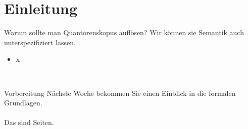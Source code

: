 \section{Einleitung}

\begin{frame}
  {Warum sollte man Quantorenskopus auflösen?}
  \onslide<+->
  \onslide<+->
  Wir können sie Semantik auch unterspezifiziert lassen.\\
  \Zeile
  \begin{itemize}[<+->]
    \item x
  \end{itemize}
  \Zeile
  \onslide<+->
  \centering 
  \\
\end{frame}

\begin{frame}
  {Vorbereitung}
  \onslide<+->
  \onslide<+->
  \centering 
  \large
  Nächste Woche bekommen Sie einen Einblick in die formalen Grundlagen.\\
  \onslide<+->
  \Zeile
  \\
  \onslide<+->
  \Viertelzeile
  Das sind  Seiten.\\
\end{frame}
